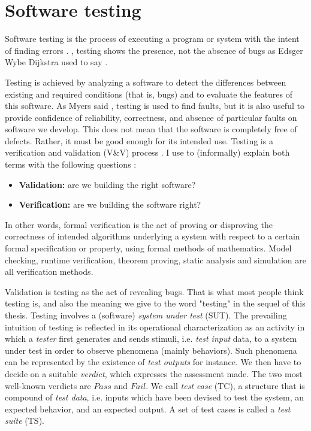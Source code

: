 \section{Software testing}
\label{sec:related:testing}

Software testing is the process of executing a program or system
with the intent of finding errors \cite{Myers:1979:AST:539883}.
, testing shows the presence, not the absence of bugs as
Edsger Wybe Dijkstra used to say \cite{Buxton:1970:SET:1102021}.

Testing is achieved by analyzing a software to detect the
differences between existing and required conditions (that is,
bugs) and to evaluate the features of this software. As Myers
said \cite{Myers:1979:AST:539883}, testing is used to find
faults, but it is also useful to provide confidence of
reliability, correctness, and absence of particular faults on
software we develop. This does not mean that the software is
completely free of defects. Rather, it must be good enough for
its intended use.  Testing is a verification and validation
(V\&V) process \cite{wallace1989software}. I use to (informally)
explain both terms with the following questions \cite{Boehm1979}:

\begin{itemize}
    \item \textbf{Validation:} are we building the right software?
    \item \textbf{Verification:} are we building the software right?
\end{itemize}

In other words, formal verification is the act of proving or
disproving the correctness of intended algorithms underlying a
system with respect to a certain formal specification or
property, using formal methods of mathematics. Model checking,
runtime verification, theorem proving, static analysis and
simulation are all verification methods.

Validation is testing as the act of revealing bugs. That is what
most people think testing is, and also the meaning we give to the
word "testing" in the sequel of this thesis. Testing involves a
(software) \textit{system under test} (SUT). The prevailing
intuition of testing is reflected in its operational
characterization as an activity in which a \textit{tester} first
generates and sends stimuli, i.e. \textit{test input} data, to a
system under test in order to observe phenomena (mainly
behaviors). Such phenomena can be represented by the existence of
\textit{test outputs} for instance. We then have to decide on a
suitable \textit{verdict}, which expresses the assessment made.
The two most well-known verdicts are $Pass$ and $Fail$.
We call \textit{test case} (TC), a structure that is compound of
\textit{test data}, i.e.  inputs which have been devised to test
the system, an expected behavior, and an expected output. A set
of test cases is called a \textit{test suite} (TS).


